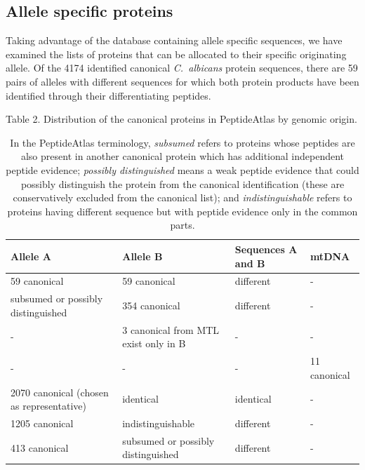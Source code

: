 \subsection*{Allele specific proteins}

Taking advantage of the database containing allele specific sequences, we have examined
the lists of proteins that can be allocated to their specific originating allele.
Of the 4174 identified canonical \textit{\mbox{C. albicans}} protein sequences, there are 59 pairs of alleles
with different sequences for which both protein products have been identified through their
differentiating peptides.

\begin{table}[t]
\caption*{Table 2. Distribution of the canonical proteins in PeptideAtlas by genomic origin.}
\renewcommand{\arraystretch}{2}
\footnotesize
\centering
\begin{tabular}{p{2cm} p{2.5cm} p{2.5cm} p{2cm} }
\hline
Allele A  & Allele B & Sequences A and B & mtDNA \\
\hline
59 canonical & 59 canonical & different & -\\
subsumed or \newline possibly \mbox{distinguished} & 354 canonical & different & -\\
- & 3 canonical from MTL \newline exist only in B & - & -\\
- & - & - & 11 canonical \\
2070 canonical \newline (chosen as \mbox{representative}) & identical & identical & - \\
1205 canonical & indistinguishable & different & - \\
413 canonical & subsumed or \newline possibly distinguished & different & - \\
\hline
\end{tabular}
\medskip
\caption*{In the
PeptideAtlas terminology, \emph{subsumed} refers to proteins whose peptides are also present in another
canonical protein which has additional independent peptide evidence; \emph{possibly distinguished}
means a weak peptide evidence that could possibly distinguish the protein from the canonical
identification (these are conservatively excluded from the canonical list); and \emph{indistinguishable}
refers to proteins having different sequence but with peptide evidence only in the common parts.}
\end{table}



